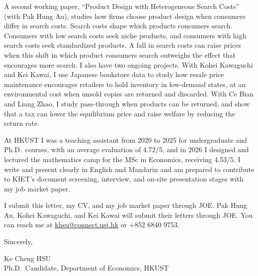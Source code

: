 \documentclass[11pt]{article}
\begin{document}
A second working paper, ``Product Design with Heterogeneous Search Costs'' (with Pak Hung Au), studies how firms choose product design when consumers differ in search costs. Search costs shape which products consumers search. Consumers with low search costs seek niche products, and consumers with high search costs seek standardized products. A fall in search costs can raise prices when this shift in which product consumers search outweighs the effect that encourages more search. I also have two ongoing projects. With Kohei Kawaguchi and Kei Kawai, I use Japanese bookstore data to study how resale price maintenance encourages retailers to hold inventory in low-demand states, at an environmental cost when unsold copies are returned and discarded. With Ce Bian and Liang Zhao, I study pass-through when products can be returned, and show that a tax can lower the equilibrium price and raise welfare by reducing the return rate.

At HKUST I was a teaching assistant from 2020 to 2025 for undergraduate and Ph.D.\ courses, with an average evaluation of 4.72/5, and in 2026 I designed and lectured the mathematics camp for the MSc in Economics, receiving 4.53/5. I write and present clearly in English and Mandarin and am prepared to contribute to KIET's document screening, interview, and on-site presentation stages with my job market paper.

I submit this letter, my CV, and my job market paper through JOE. Pak Hung Au, Kohei Kawaguchi, and Kei Kawai will submit their letters through JOE. You can reach me at \href{mailto:khsu@connect.ust.hk}{khsu@connect.ust.hk} or +852 6840 9753.

\vspace{0.25em}
Sincerely,

\vspace{0.25em}
Ke Cheng HSU \\
Ph.D.\ Candidate, Department of Economics, HKUST
\end{document}

